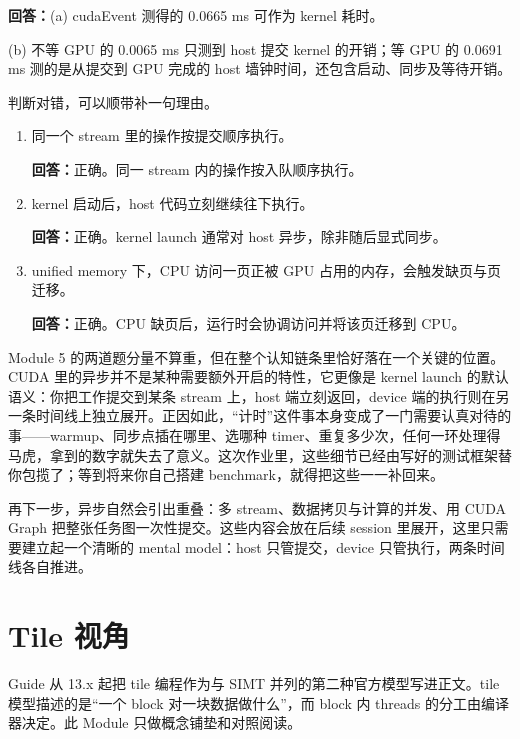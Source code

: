 \documentclass[11pt,a4paper,fontset=windows]{ctexart}
\begin{document}
\par\textbf{回答：}(a) cudaEvent 测得的 0.0665 ms 可作为 kernel 耗时。

(b) 不等 GPU 的 0.0065 ms 只测到 host 提交 kernel 的开销；等 GPU 的 0.0691 ms 测的是从提交到 GPU 完成的 host 墙钟时间，还包含启动、同步及等待开销。

判断对错，可以顺带补一句理由。
\begin{enumerate}[label=(\alph*)]
  \item 同一个 stream 里的操作按提交顺序执行。
  \par\textbf{回答：}正确。同一 stream 内的操作按入队顺序执行。
  \item kernel 启动后，host 代码立刻继续往下执行。
  \par\textbf{回答：}正确。kernel launch 通常对 host 异步，除非随后显式同步。
  \item unified memory 下，CPU 访问一页正被 GPU 占用的内存，会触发缺页与页迁移。
  \par\textbf{回答：}正确。CPU 缺页后，运行时会协调访问并将该页迁移到 CPU。
\end{enumerate}

\begin{lookback}
Module 5 的两道题分量不算重，但在整个认知链条里恰好落在一个关键的位置。CUDA 里的异步并不是某种需要额外开启的特性，它更像是 kernel launch 的默认语义：你把工作提交到某条 stream 上，host 端立刻返回，device 端的执行则在另一条时间线上独立展开。正因如此，“计时”这件事本身变成了一门需要认真对待的事——warmup、同步点插在哪里、选哪种 timer、重复多少次，任何一环处理得马虎，拿到的数字就失去了意义。这次作业里，这些细节已经由写好的测试框架替你包揽了；等到将来你自己搭建 benchmark，就得把这些一一补回来。

再下一步，异步自然会引出重叠：多 stream、数据拷贝与计算的并发、用 CUDA Graph 把整张任务图一次性提交。这些内容会放在后续 session 里展开，这里只需要建立起一个清晰的 mental model：host 只管提交，device 只管执行，两条时间线各自推进。
\end{lookback}

\section{Tile 视角}

Guide 从 13.x 起把 tile 编程作为与 SIMT 并列的第二种官方模型写进正文。tile 模型描述的是“一个 block 对一块数据做什么”，而 block 内 threads 的分工由编译器决定。此 Module 只做概念铺垫和对照阅读。
\end{document}
